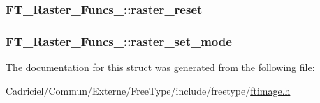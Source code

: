 \hypertarget{struct_f_t___raster___funcs___a91e9decd6066090a5f306f33f9815d39}{
\subsubsection[{raster\-\_\-reset}]{ F\-T\-\_\-\-Raster\-\_\-\-Funcs\-\_\-\-::raster\-\_\-reset}}\label{struct_f_t___raster___funcs___a91e9decd6066090a5f306f33f9815d39}
\hypertarget{struct_f_t___raster___funcs___a3b37c781e54cf933cb60f57f2d45b32c}{
\subsubsection[{raster\-\_\-set\-\_\-mode}]{ F\-T\-\_\-\-Raster\-\_\-\-Funcs\-\_\-\-::raster\-\_\-set\-\_\-mode}}\label{struct_f_t___raster___funcs___a3b37c781e54cf933cb60f57f2d45b32c}


The documentation for this struct was generated from the following file\-:\begin{DoxyCompactItemize}
\item 
Cadriciel/\-Commun/\-Externe/\-Free\-Type/include/freetype/\hyperlink{ftimage_8h}{ftimage.\-h}\end{DoxyCompactItemize}
